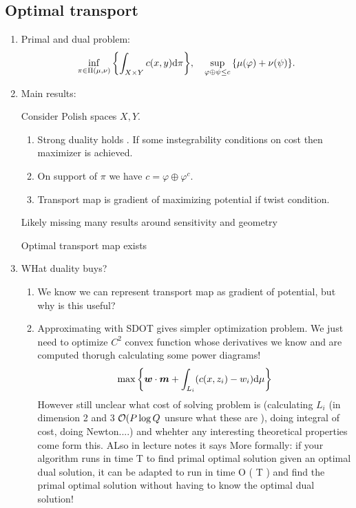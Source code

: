 \documentclass[
    a4paper,
    DIV=13,
    abstract=true,
    numbers=noenddot
]{scrartcl}
\begin{document}
\subsection{Optimal transport}
\begin{enumerate}
    \item Primal and dual problem:
    \begin{align*}
        \infs[\pi \in \Pi(\mu,\nu)]{\int_{X \times Y}c(x,y)\d \pi }, \quad \sups[\varphi \oplus\psi \le c]{\mu(\varphi)+ \nu(\psi)}.
    \end{align*}
    \item Main results:
      \begin{theorem}
        Consider Polish spaces $X,Y$.
      \begin{enumerate}
          \item Strong duality holds \cite[Theorem 3.1]{thorpe2018introduction}. If some instegrability conditions on cost then maximizer is achieved.
          \item On support of $\pi$ we have $c= \varphi\oplus \varphi^c$.
          \item Transport map is gradient of maximizing potential if twist condition.
        \end{enumerate}    
      \end{theorem}
      Likely missing many results around sensitivity and geometry
      \begin{theorem}
          Optimal transport map exists
      \end{theorem}
    \item WHat duality buys?  
      \begin{enumerate}
          \item We know we can represent transport map as gradient of potential, but why is this useful?
          \item Approximating with SDOT gives simpler optimization problem. We just need to optimize $C^2$ convex function whose derivatives we know and are computed thorugh calculating some power diagrams!
            \begin{align*}
                \maxs{\b{w}\cdot \b{m}+ \int_{L_i}(c(x,z_i)-w_i)\d \mu  }
            \end{align*}
            However still unclear what cost of solving problem is (calculating $L_i$ (in dimension 2 and 3 $\Oo(P \log{Q}$ unsure what these are \cite{aurenhammer1987power}), doing integral of cost, doing Newton....) and whehter any interesting theoretical properties come form this. ALso in lecture notes it says 
More formally: if your algorithm runs in time 
T
 to find primal optimal solution given an optimal dual solution, it can be adapted to run in time 
O
(
T
)
 and find the primal optimal solution without having to know the optimal dual solution!


\end{enumerate}
\end{enumerate}
\end{document}
